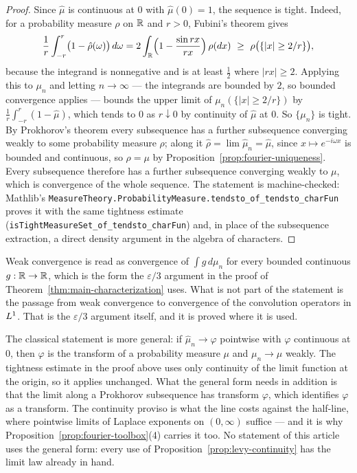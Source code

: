 \begin{proof}
Since $\hat\mu$ is continuous at $0$ with $\hat\mu(0) = 1$, the sequence is tight. Indeed, for a
probability measure $\rho$ on $\mathbb{R}$ and $r > 0$, Fubini's theorem gives
\[
  \frac1r\int_{-r}^{r}\bigl(1 - \hat\rho(\omega)\bigr)\,d\omega
  = 2\int_{\mathbb{R}}\Bigl(1 - \frac{\sin rx}{rx}\Bigr)\,\rho(dx)
  \ \ge\ \rho\bigl(\{|x| \ge 2/r\}\bigr),
\]
because the integrand is nonnegative and is at least $\tfrac12$ where $|rx| \ge 2$. Applying
this to $\mu_n$ and letting $n \to \infty$ --- the integrands are bounded by $2$, so bounded
convergence applies --- bounds the upper limit of $\mu_n(\{|x| \ge 2/r\})$ by
$\frac1r\int_{-r}^r(1 - \hat\mu)$, which tends to $0$ as $r \downarrow 0$ by continuity of
$\hat\mu$ at $0$. So $\{\mu_n\}$ is tight. By Prokhorov's theorem every subsequence has a
further subsequence converging weakly to some probability measure $\rho$; along it
$\hat\rho = \lim \hat\mu_n = \hat\mu$, since $x \mapsto e^{-i\omega x}$ is bounded and
continuous, so $\rho = \mu$ by Proposition~\ref{prop:fourier-uniqueness}. Every subsequence
therefore has a further subsequence converging weakly to $\mu$, which is convergence of the
whole sequence. The statement is machine-checked: Mathlib's
\texttt{MeasureTheory.ProbabilityMeasure.tendsto\_of\_tendsto\_charFun} proves it with the same
tightness estimate (\texttt{isTightMeasureSet\_of\_tendsto\_charFun}) and, in place of the
subsequence extraction, a direct density argument in the algebra of characters.
\end{proof}

Weak convergence is read as convergence of $\int g\,d\mu_n$ for every bounded continuous
$g : \mathbb{R} \to \mathbb{R}$, which is the form the $\varepsilon/3$ argument in the proof of
Theorem~\ref{thm:main-characterization} uses. What is not part of the statement is the
passage from weak convergence to convergence of the convolution operators in $L^1$. That is
the $\varepsilon/3$ argument itself, and it is proved where it is used.

\begin{remark}\label{rem:levy-continuity-general}
The classical statement is more general: if $\hat\mu_n \to \varphi$ pointwise with $\varphi$
continuous at $0$, then $\varphi$ is the transform of a probability measure $\mu$ and
$\mu_n \to \mu$ weakly. The tightness estimate in the proof above uses only continuity of the
limit function at the origin, so it applies unchanged. What the general form needs in addition
is that the limit along a Prokhorov subsequence has transform $\varphi$, which identifies
$\varphi$ as a transform. The continuity proviso is what the line costs
against the half-line, where pointwise limits of Laplace exponents on $(0,\infty)$ suffice
--- and it is why
Proposition~\ref{prop:fourier-toolbox}(4) carries it too. No statement of this article uses
the general form: every use of Proposition~\ref{prop:levy-continuity} has the limit law
already in hand.
\end{remark}

